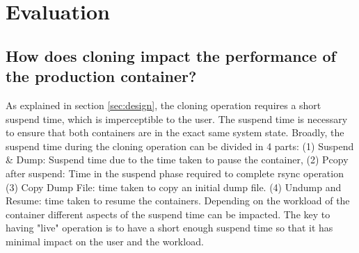 
\section{Evaluation}
\label{sec:evaluation}

\subsection{How does cloning impact the performance of the production container?}
\label{sec:performance}
As explained in section \ref{sec:design}, the cloning operation requires a short suspend time, which is imperceptible to the user.
The suspend time is necessary to ensure that both containers are in the exact same system state.
Broadly, the suspend time during the cloning operation can be divided in 4 parts: 
(1) Suspend \& Dump: Suspend time due to the time taken to pause the container, 
(2) Pcopy after suspend: Time in the suspend phase required to complete rsync operation 
(3) Copy Dump File: time taken to copy an initial dump file.
(4) Undump and Resume: time taken to resume the containers. 
Depending on the workload of the container different aspects of the suspend time can be impacted.
The key to having "live" operation is to have a short enough suspend time so that it has minimal impact on the user and the workload.

